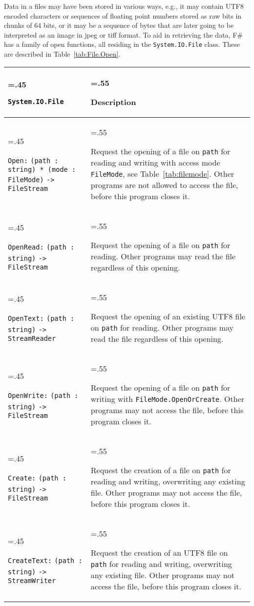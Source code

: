 Data in a files may have been stored in various ways, e.g., it may contain UTF8 encoded characters or sequences of floating point numbers stored as raw bits in chunks of 64 bits, or it may be a sequence of bytes that are later going to be interpreted as an image in jpeg or tiff format. To aid in retrieving the data, F\# has a family of open functions, all residing in the \lstinline!System.IO.File! class. These are described in Table~\ref{tab:File.Open}.
\begin{table}
  \begin{center}
    \begin{tabularx}{\linewidth}{|>{\hsize=.45\hsize\raggedright\arraybackslash}X|>{\hsize=.55\hsize\raggedright\arraybackslash}X|}
      \hline
      \rowcolor{headerRowColor} \lstinline{System.IO.File} & Description\\
      \hline
      \lstinline{Open:} \mbox{\lstinline{(path : string) * (mode : FileMode)}} \mbox{\lstinline{-> FileStream}} & Request the opening of a file on \lstinline{path} for reading and writing with access mode \lstinline!FileMode!, see Table~\ref{tab:filemode}. Other programs are not allowed to access the file, before this program closes it.\\
      \hline
      \lstinline{OpenRead:} \mbox{\lstinline{(path : string)}}  \mbox{\lstinline{-> FileStream}} & Request the opening of a file on \lstinline{path} for reading. Other programs may read the file regardless of this opening.\\
      \hline
      \lstinline{OpenText:} \mbox{\lstinline{(path : string)}}  \mbox{\lstinline{-> StreamReader}} & Request the opening of an existing UTF8 file on \lstinline{path} for reading. Other programs may read the file regardless of this opening.\\
      \hline
      \lstinline{OpenWrite:} \mbox{\lstinline{(path : string)}}  \mbox{\lstinline{-> FileStream}} & Request the opening of a file on \lstinline{path} for writing with \lstinline{FileMode.OpenOrCreate}. Other programs may not access the file, before this program closes it.\\
      \hline
      \lstinline{Create:} \mbox{\lstinline{(path : string)}} \mbox{\lstinline{-> FileStream}} & Request the creation of a file on \lstinline{path} for reading and writing, overwriting any existing file. Other programs may not access the file, before this program closes it.\\
      \hline
      \lstinline{CreateText:} \mbox{\lstinline{(path : string)}} \mbox{\lstinline{-> StreamWriter}} & Request the creation of an UTF8 file on \lstinline{path} for reading and writing, overwriting any existing file. Other programs may not access the file, before this program closes it.\\

\end{tabularx}
\end{center}
\end{table}
